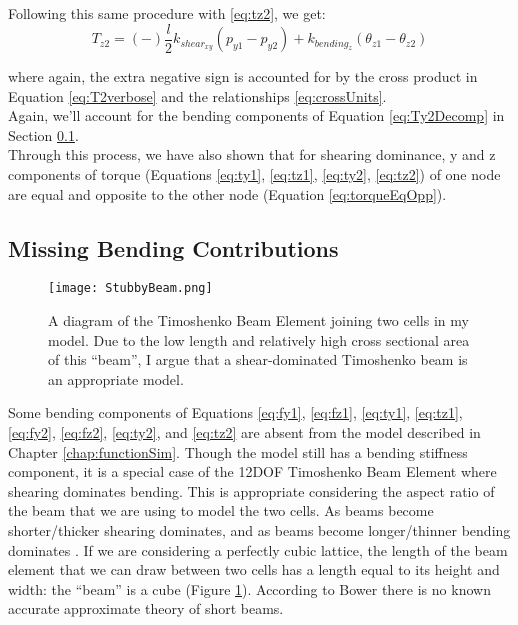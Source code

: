 {Following this same procedure with \ref{eq:tz2}, we get:
\[  T_{z2} =  (-)\dfrac{l}{2}k_{shear_{xy}}(p_{y1} - p_{y2}) + k_{bending_z}(\theta_{z1}  - \theta_{z2}) \]

where again, the extra negative sign is accounted for by the cross product in Equation \ref{eq:T2verbose} and the relationships \ref{eq:crossUnits}.\\

Again, we'll account for the bending components of Equation \ref{eq:Ty2Decomp} in Section \ref{sec:bendingdominance}.\\

Through this process, we have also shown that for shearing dominance, y and z components of torque (Equations \ref{eq:ty1}, \ref{eq:tz1}, \ref{eq:ty2}, \ref{eq:tz2}) of one node are equal and opposite to the other node (Equation \ref{eq:torqueEqOpp}).

\subsection{Missing Bending Contributions}\label{sec:bendingdominance}

\begin{figure}
  \texttt{[image: StubbyBeam.png]}
  \caption{A diagram of the Timoshenko Beam Element joining two cells in my model.  Due to the low length and relatively high cross sectional area of this ``beam'', I argue that a shear-dominated Timoshenko beam is an appropriate model.}
  \label{fig:StubbyBeam}
\end{figure}

Some bending components of Equations \ref{eq:fy1}, \ref{eq:fz1}, \ref{eq:ty1}, \ref{eq:tz1}, \ref{eq:fy2}, \ref{eq:fz2}, \ref{eq:ty2},  and \ref{eq:tz2} are absent from the model described in Chapter \ref{chap:functionSim}.  Though the model still has a bending stiffness component, it is a special case of the 12DOF Timoshenko Beam Element where shearing dominates bending.  This is appropriate considering the aspect ratio of the beam that we are using to model the two cells.  As beams become shorter/thicker shearing dominates, and as beams become longer/thinner bending dominates \cite{Bower2009}.  If we are considering a perfectly cubic lattice, the length of the beam element that we can draw between two cells has a length equal to its height and width: the ``beam'' is a cube (Figure \ref{fig:StubbyBeam}).  According to Bower \cite{Bower2009} there is no known accurate approximate theory of short beams.

}
